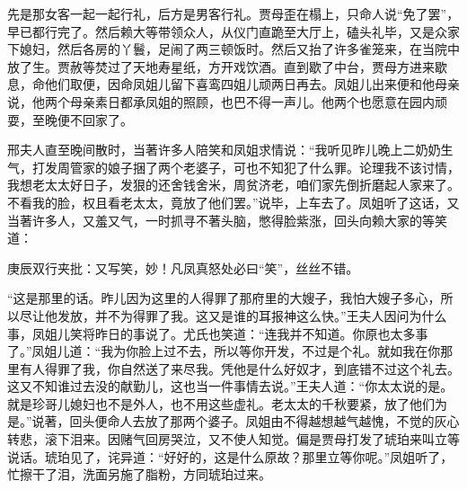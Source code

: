 \begin{parag}
    先是那女客一起一起行礼，后方是男客行礼。贾母歪在榻上，只命人说“免了罢”，早已都行完了。然后赖大等带领众人，从仪门直跪至大厅上，磕头礼毕，又是众家下媳妇，然后各房的丫鬟，足闹了两三顿饭时。然后又抬了许多雀笼来，在当院中放了生。贾赦等焚过了天地寿星纸，方开戏饮酒。直到歇了中台，贾母方进来歇息，命他们取便，因命凤姐儿留下喜鸾四姐儿顽两日再去。凤姐儿出来便和他母亲说，他两个母亲素日都承凤姐的照顾，也巴不得一声儿。他两个也愿意在园内顽耍，至晚便不回家了。
\end{parag}


\begin{parag}
    邢夫人直至晚间散时，当著许多人陪笑和凤姐求情说：“我听见昨儿晚上二奶奶生气，打发周管家的娘子捆了两个老婆子，可也不知犯了什么罪。论理我不该讨情，我想老太太好日子，发狠的还舍钱舍米，周贫济老，咱们家先倒折磨起人家来了。不看我的脸，权且看老太太，竟放了他们罢。”说毕，上车去了。凤姐听了这话，又当著许多人，又羞又气，一时抓寻不著头脑，憋得脸紫涨，回头向赖大家的等笑道：\begin{note}庚辰双行夹批：又写笑，妙！凡凤真怒处必曰“笑”，丝丝不错。\end{note}“这是那里的话。昨儿因为这里的人得罪了那府里的大嫂子，我怕大嫂子多心，所以尽让他发放，并不为得罪了我。这又是谁的耳报神这么快。”王夫人因问为什么事，凤姐儿笑将昨日的事说了。尤氏也笑道：“连我并不知道。你原也太多事了。”凤姐儿道：“我为你脸上过不去，所以等你开发，不过是个礼。就如我在你那里有人得罪了我，你自然送了来尽我。凭他是什么好奴才，到底错不过这个礼去。这又不知谁过去没的献勤儿，这也当一件事情去说。”王夫人道：“你太太说的是。就是珍哥儿媳妇也不是外人，也不用这些虚礼。老太太的千秋要紧，放了他们为是。”说著，回头便命人去放了那两个婆子。凤姐由不得越想越气越愧，不觉的灰心转悲，滚下泪来。因赌气回房哭泣，又不使人知觉。偏是贾母打发了琥珀来叫立等说话。琥珀见了，诧异道：“好好的，这是什么原故？那里立等你呢。”凤姐听了，忙擦干了泪，洗面另施了脂粉，方同琥珀过来。
\end{parag}


